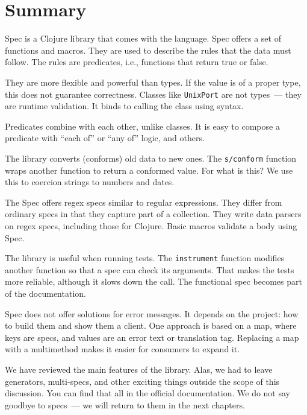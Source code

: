\section{Summary}

Spec is a Clojure library that comes with the language. Spec offers a set of functions and macros. They are used to describe the rules that the data must follow. The rules are predicates, i.e., functions that return true or false.

They are more flexible and powerful than types. If the value is of a proper type, this does not guarantee correctness. Classes like \verb|UnixPort| are not types~--- they are runtime validation. It binds to calling the class using syntax.

Predicates combine with each other, unlike classes. It is easy to compose a predicate with ``each of'' or ``any of'' logic, and others.

The library converts (conforms) old data to new ones. The \verb|s/conform| function wraps another function to return a conformed value. For what is this? We use this to coercion strings to numbers and dates.

The Spec offers regex specs similar to regular expressions. They differ from ordinary specs in that they capture part of a collection. They write data parsers on regex specs, including those for Clojure. Basic macros validate a body using Spec.

The library is useful when running tests. The \verb|instrument| function modifies another function so that a spec can check its arguments. That makes the tests more reliable, although it slows down the call. The functional spec becomes part of the documentation.

Spec does not offer solutions for error messages. It depends on the project: how to build them and show them a client. One approach is based on a map, where keys are specs, and values are an error text or translation tag. Replacing a map with a multimethod makes it easier for consumers to expand it.

We have reviewed the main features of the library. Alas, we had to leave generators, multi-specs, and other exciting things outside the scope of this discussion. You can find that all in the official documentation. We do not say goodbye to specs~--- we will return to them in the next chapters.
